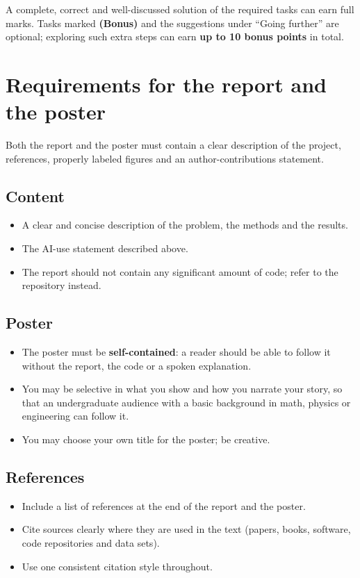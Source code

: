 \documentclass[11pt,a4paper]{article}
\newcommand{\bonus}{\textbf{(Bonus)}}
\begin{document}
A complete, correct and well-discussed
solution of the required tasks can earn full marks. Tasks marked
\bonus{} and the suggestions under ``Going further'' are optional; exploring
such extra steps can earn \textbf{up to 10 bonus points} in total.

\section*{Requirements for the report and the poster}
Both the report and the poster must contain a clear description of the
project, references, properly labeled figures and an author-contributions
statement.

\subsection*{Content}
\begin{itemize}
  \item A clear and concise description of the problem, the methods and the
        results.
  \item The AI-use statement described above.
  \item The report should not contain any significant amount of code; refer
        to the repository instead.
\end{itemize}

\subsection*{Poster}
\begin{itemize}
  \item The poster must be \textbf{self-contained}: a reader should be able to
        follow it without the report, the code or a spoken explanation.
  \item You may be selective in what you show and how you narrate your story,
        so that an undergraduate audience with a basic background in math,
        physics or engineering can follow it.
  \item You may choose your own title for the poster; be creative.
\end{itemize}

\subsection*{References}
\begin{itemize}
  \item Include a list of references at the end of the report and the poster.
  \item Cite sources clearly where they are used in the text (papers, books,
        software, code repositories and data sets).
  \item Use one consistent citation style throughout.
\end{itemize}
\end{document}
